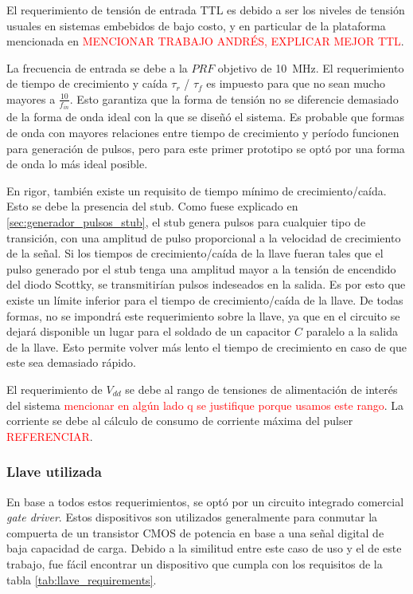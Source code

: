 El requerimiento de tensión de entrada TTL es debido a ser los niveles de
tensión usuales en sistemas embebidos de bajo costo, y en particular de la
plataforma mencionada en \textcolor{red}{MENCIONAR TRABAJO ANDRÉS, EXPLICAR
MEJOR TTL}.

La frecuencia de  entrada se debe a la $PRF$ objetivo de \qty{10}{\mega\hertz}.
El requerimiento de tiempo de crecimiento y caída $\tau_{r}$ / $\tau_{f}$ es
impuesto para que no sean mucho mayores a $\frac{10}{f_{in}}$. Esto garantiza
que la forma de tensión no se diferencie demasiado de la forma de onda ideal con
la que se diseñó el sistema. Es probable que formas de onda con mayores
relaciones entre tiempo de crecimiento y período funcionen para generación de
pulsos, pero para este primer prototipo se optó por una forma de onda lo más
ideal posible.

En rigor, también existe un requisito de tiempo mínimo de crecimiento/caída.
Esto se debe la presencia del stub. Como fuese explicado en
\ref{sec:generador_pulsos_stub}, el stub genera pulsos para cualquier tipo de
transición, con una amplitud de pulso proporcional a la velocidad de crecimiento
de la señal. Si los tiempos de crecimiento/caída de la llave fueran tales que el
pulso generado por el stub tenga una amplitud mayor a la tensión de encendido
del diodo Scottky, se transmitirían pulsos indeseados en la salida. Es por esto que
existe un límite inferior para el tiempo de crecimiento/caída de la llave. De
todas formas, no se impondrá  este requerimiento sobre la llave, ya que en el
circuito se dejará disponible un lugar para el soldado de un capacitor $C$
paralelo a la salida de la llave. Esto permite volver más lento el tiempo de
crecimiento en caso de que este sea demasiado rápido.

El requerimiento de $V_{dd}$ se debe al rango de tensiones de alimentación de
interés del sistema \textcolor{red}{mencionar en algún lado q se justifique
porque usamos este rango}. La corriente se debe al cálculo de consumo de
corriente máxima del pulser \textcolor{red}{REFERENCIAR}.

\subsubsection{Llave utilizada}

En base a todos estos requerimientos, se optó por un circuito integrado
comercial \textit{gate driver}. Estos dispositivos son utilizados generalmente
para conmutar la compuerta de un transistor CMOS de potencia en base a  una
señal digital de baja capacidad de carga. Debido a la similitud entre este caso
de uso y el de este trabajo, fue fácil encontrar un dispositivo que cumpla con
los requisitos de la tabla \ref{tab:llave_requirements}.


